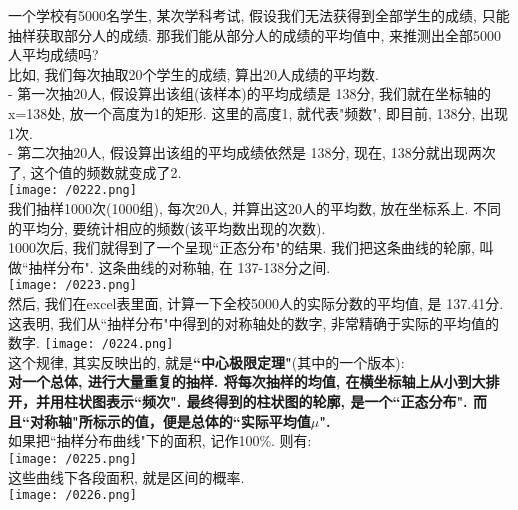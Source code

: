 \documentclass[UTF8]{ctexart}
\begin{document}
	\begin{myEnvSample}
		一个学校有5000名学生, 某次学科考试, 假设我们无法获得到全部学生的成绩, 只能抽样获取部分人的成绩. 那我们能从部分人的成绩的平均值中, 来推测出全部5000人平均成绩吗? \\
				
		比如, 我们每次抽取20个学生的成绩, 算出20人成绩的平均数.\\		
		- 第一次抽20人, 假设算出该组(该样本)的平均成绩是 138分, 我们就在坐标轴的 x=138处, 放一个高度为1的矩形. 这里的高度1, 就代表"频数", 即目前, 138分, 出现1次. \\
		
		- 第二次抽20人,  假设算出该组的平均成绩依然是 138分, 现在, 138分就出现两次了, 这个值的频数就变成了2. \\
						
		\texttt{[image: /0222.png]} \\
		
		我们抽样1000次(1000组), 每次20人, 并算出这20人的平均数, 放在坐标系上. 不同的平均分, 要统计相应的频数(该平均数出现的次数). \\
		1000次后, 我们就得到了一个呈现``正态分布"的结果. 我们把这条曲线的轮廓, 叫做``抽样分布". 这条曲线的对称轴, 在 137-138分之间. \\
				
		\texttt{[image: /0223.png]} \\		
		
		然后, 我们在excel表里面, 计算一下全校5000人的实际分数的平均值, 是 137.41分. 这表明, 我们从``抽样分布"中得到的对称轴处的数字, 非常精确于实际的平均值的数字.
		\texttt{[image: /0224.png]} \\			
		
		这个规律, 其实反映出的, 就是\textbf{``中心极限定理"}(其中的一个版本):  \\
		\textbf{对一个总体, 进行大量重复的抽样. 将每次抽样的均值, 在横坐标轴上从小到大排开，并用柱状图表示``频次". 最终得到的柱状图的轮廓, 是一个``正态分布". 而且``对称轴"所标示的值，便是总体的``实际平均值$\mu$".} \\
		
		如果把``抽样分布曲线"下的面积, 记作100\%. 则有: \\
		\texttt{[image: /0225.png]} \\	
			
		这些曲线下各段面积, 就是区间的概率. \\
		\texttt{[image: /0226.png]}		
	\end{myEnvSample}
\end{document}
